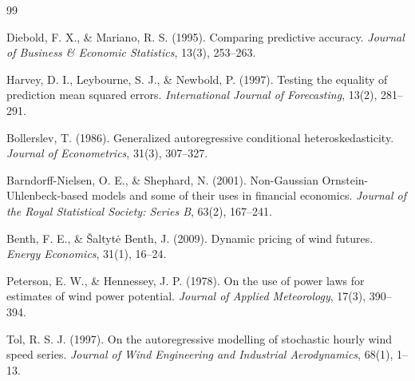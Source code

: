 \documentclass[11pt, a4paper, twoside]{article}
\begin{document}
\begin{thebibliography}{99}

Diebold, F. X., \& Mariano, R. S. (1995). Comparing predictive accuracy. \textit{Journal of Business \& Economic Statistics}, 13(3), 253--263.

Harvey, D. I., Leybourne, S. J., \& Newbold, P. (1997). Testing the equality of prediction mean squared errors. \textit{International Journal of Forecasting}, 13(2), 281--291.

Bollerslev, T. (1986). Generalized autoregressive conditional heteroskedasticity. \textit{Journal of Econometrics}, 31(3), 307--327.

Barndorff-Nielsen, O. E., \& Shephard, N. (2001). Non-Gaussian Ornstein-Uhlenbeck-based models and some of their uses in financial economics. \textit{Journal of the Royal Statistical Society: Series B}, 63(2), 167--241.

Benth, F. E., \& Šaltytė Benth, J. (2009). Dynamic pricing of wind futures. \textit{Energy Economics}, 31(1), 16--24.

Peterson, E. W., \& Hennessey, J. P. (1978). On the use of power laws for estimates of wind power potential. \textit{Journal of Applied Meteorology}, 17(3), 390--394.

Tol, R. S. J. (1997). On the autoregressive modelling of stochastic hourly wind speed series. \textit{Journal of Wind Engineering and Industrial Aerodynamics}, 68(1), 1--13.

\end{thebibliography}
\end{document}
